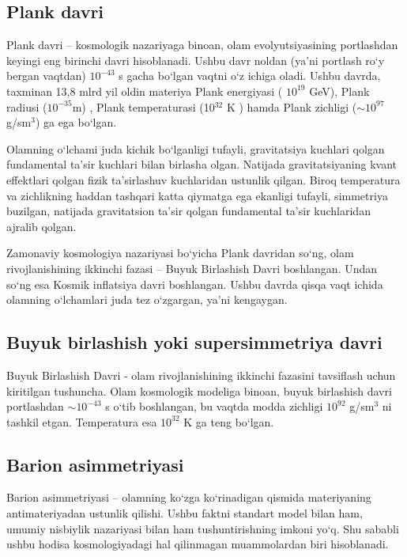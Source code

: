 \documentclass[14pt]{scrartcl}
\begin{document}
\subsection{Plank davri}
\hspace{0.6cm}
Plank davri -- kosmologik nazariyaga binoan, olam evolyutsiyasining portlashdan keyingi eng birinchi davri hisoblanadi. Ushbu davr noldan (ya'ni portlash ro`y bergan vaqtdan) $10^{-43}$ s gacha bo`lgan vaqtni o`z ichiga oladi. Ushbu davrda, taxminan 13,8 mlrd yil oldin materiya Plank energiyasi ( $10^{19}$ GeV), Plank radiusi ($10^{-35}$m) , Plank temperaturasi (10$^{32}$ K ) hamda Plank zichligi ($\sim10^{97}$g/sm$^{3}$) ga ega bo`lgan.

Olamning o`lchami juda kichik bo`lganligi tufayli, gravitatsiya kuchlari qolgan fundamental ta'sir kuchlari bilan birlasha olgan. Natijada gravitatsiyaning kvant effektlari qolgan fizik ta'sirlashuv kuchlaridan ustunlik qilgan. Biroq temperatura va zichlikning haddan tashqari katta qiymatga ega ekanligi tufayli, simmetriya buzilgan, natijada gravitatsion ta'sir qolgan fundamental ta'sir kuchlaridan ajralib qolgan. 

Zamonaviy kosmologiya nazariyasi bo`yicha Plank davridan so`ng, olam rivojlanishining ikkinchi fazasi -- Buyuk Birlashish Davri boshlangan. Undan so`ng esa Kosmik inflatsiya davri boshlangan. Ushbu davrda qisqa vaqt ichida olamning o`lchamlari juda tez o`zgargan, ya'ni kengaygan.


\subsection{Buyuk birlashish yoki supersimmetriya davri}
\hspace{0.6cm}
Buyuk Birlashish Davri - olam rivojlanishining ikkinchi fazasini tavsiflash uchun kiritilgan tushuncha. Olam kosmologik modeliga binoan, buyuk birlashish davri portlashdan $\sim 10^{-43}$ s o`tib boshlangan, bu vaqtda modda zichligi $10^{92}$ g/sm$^{3}$ ni tashkil etgan. Temperatura esa $10^{32}$ K ga teng bo`lgan. 


\subsection{Barion asimmetriyasi}
\hspace{0.6cm}
Barion asimmetriyasi -- olamning ko`zga ko`rinadigan qismida materiyaning antimateriyadan ustunlik qilishi. Ushbu faktni standart model bilan ham, umumiy nisbiylik nazariyasi bilan ham tushuntirishning imkoni yo`q. Shu sababli ushbu hodisa kosmologiyadagi hal qilinmagan muammolardan biri hisoblanadi.
\end{document}
